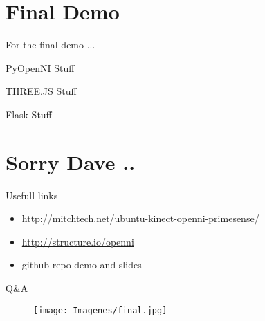 \documentclass[bigger]{beamer}
\begin{document}

\section{Final Demo}
\begin{frame}{\ECFAugie For the final demo ...}
\end{frame}

\begin{frame}{\ECFAugie PyOpenNI Stuff}
\end{frame}


\begin{frame}{\ECFAugie THREE.JS Stuff}
\end{frame}


\begin{frame}{\ECFAugie Flask Stuff}
\end{frame}

\section{Sorry Dave ..}

\begin{frame}{\ECFAugie Usefull links}
\begin{itemize}
	\item \url{http://mitchtech.net/ubuntu-kinect-openni-primesense/}
	\item \url{http://structure.io/openni}
	\item github repo demo and slides 
\end{itemize}
\end{frame}

\begin{frame}{\ECFAugie Q\&A}
\begin{figure}[h]
		\texttt{[image: Imagenes/final.jpg]}
\end{figure}
\end{frame}
\end{document}
